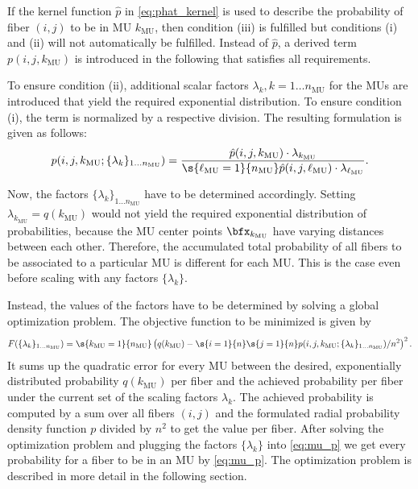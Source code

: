 If the kernel function $\hat{p}$ in \cref{eq:phat_kernel} is used to describe the probability of fiber $(i,j)$ to be in MU $k_\text{MU}$, then condition (iii) is fulfilled but conditions (i) and (ii) will not automatically be fulfilled. Instead of $\hat{p}$, a derived term $p(i,j,k_\text{MU})$ is introduced in the following that satisfies all requirements.

To ensure condition (ii), additional scalar factors $\lambda_k, k=1\dots n_\text{MU}$ for the MUs are introduced that yield the required exponential distribution.
To ensure condition (i), the term is normalized by a respective division. The resulting formulation is given as follows:
\begin{align}\label{eq:mu_p}
  p(i,j,k_\text{MU};\{\lambda_k\}_{1\dots n_\text{MU}}) = \dfrac{\hat{p}(i,j,k_\text{MU}) \cdot \lambda_{k_\text{MU}}}{\s{\ell_\text{MU}=1}{n_\text{MU}} \hat{p}(i,j,\ell_\text{MU}) \cdot \lambda_{\ell_\text{MU}}}.
\end{align}

Now, the factors $\{\lambda_k\}_{1\dots n_\text{MU}}$ have to be determined accordingly. Setting $\lambda_{k_\text{MU}} = q(k_\text{MU})$ would not yield the required exponential distribution of probabilities, because the MU center points $\bfx_{k_\text{MU}}$ have varying distances between each other.
Therefore, the accumulated total probability of all fibers to be associated to a particular MU is different for each MU. This is the case even before scaling with any factors $\{\lambda_k\}$.

Instead, the values of the factors have to be determined by solving a global optimization problem.
The objective function to be minimized is given by%
\begin{align}\label{eq:mus_objective}
  F(\{\lambda_k\}_{1\dots n_\text{MU}}) = \s{k_\text{MU}=1}{n_\text{MU}} \left(q(k_\text{MU}) - \s{i=1}{n}\s{j=1}{n}p(i,j,k_\text{MU};\{\lambda_k\}_{1\dots n_\text{MU}}) / n^2\right)^2.
\end{align}
It sums up the quadratic error for every MU between the desired, exponentially distributed probability $q(k_\text{MU})$ per fiber and the achieved probability per fiber under the current set of the scaling factors $\lambda_k$. 
The achieved probability is computed by a sum over all fibers $(i,j)$ and the formulated radial probability density function $p$ divided by $n^2$ to get the value per fiber.
After solving the optimization problem and plugging the factors $\{\lambda_k\}$ into \cref{eq:mu_p} we get every probability for a fiber to be in an MU by \cref{eq:mu_p}. The optimization problem is described in more detail in the following section.

